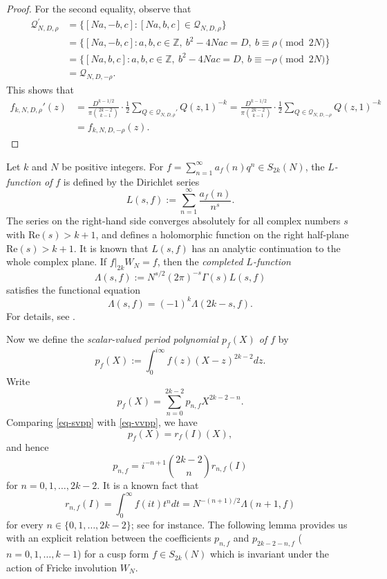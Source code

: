 \documentclass[12pt]{amsart}
\numberwithin{equation}{section}
\theoremstyle{definition}
\begin{document}
\begin{proof}
    For the second equality, observe that
    \begin{align*}
        \mathcal{Q}_{N,D,\rho}^{'}&=\{[Na,-b,c]:[Na,b,c]\in\mathcal{Q}_{N,D,\rho}\}\\
        &=\{[Na,-b,c]:a,b,c\in\mathbb{Z},~b^{2}-4Nac=D,~b\equiv\rho\pmod{2N}\}\\
        &=\{[Na,b,c]:a,b,c\in\mathbb{Z},~b^{2}-4Nac=D,~b\equiv-\rho\pmod{2N}\}\\
        &=\mathcal{Q}_{N,D,-\rho}.
    \end{align*}
    This shows that
    \begin{align*}
        f_{k,N,D,\rho}'(z)&=\frac{D^{k-1/2}}{\pi\binom{2k-2}{k-1}}\cdot\frac{1}{2}\sum_{Q\in\mathcal{Q}_{N,D,\rho}'}Q(z,1)^{-k}=\frac{D^{k-1/2}}{\pi\binom{2k-2}{k-1}}\cdot\frac{1}{2}\sum_{Q\in\mathcal{Q}_{N,D,-\rho}}Q(z,1)^{-k}\\
        &=f_{k,N,D,-\rho}(z).
    \end{align*}
\end{proof}

Let $k$ and $N$ be positive integers. For $f=\sum_{n=1}^{\infty}a_{f}(n)q^{n}\in S_{2k}(N)$, the \textit{$L$-function of} $f$ is defined by the Dirichlet series
$$L(s,f):=\sum_{n=1}^{\infty}\frac{a_{f}(n)}{n^{s}}.$$
The series on the right-hand side converges absolutely for all complex numbers $s$ with $\mathrm{Re}(s)>k+1$, and defines a holomorphic function on the right half-plane $\mathrm{Re}(s)>k+1$. It is known that $L(s,f)$ has an analytic continuation to the whole complex plane. If $f|_{2k}W_{N}=f$, then the \textit{completed $L$-function}
$$\Lambda(s,f):=N^{s/2}(2\pi)^{-s}\Gamma(s)L(s,f)$$
satisfies the functional equation
\begin{equation}\label{eq-functionaleq}
    \Lambda(s,f)=(-1)^{k}\Lambda(2k-s,f).
\end{equation}
For details, see \cite[pp. 270--271]{K92}.

Now we define the \textit{scalar-valued period polynomial $p_{f}(X)$ of $f$} by
\begin{equation}\label{eq-svpp}
    p_{f}(X):=\int_{0}^{i\infty}f(z)(X-z)^{2k-2}dz.
\end{equation}
Write
$$p_{f}(X)=\sum_{n=0}^{2k-2}p_{n,f}X^{2k-2-n}.$$
Comparing \eqref{eq-svpp} with \eqref{eq-vvpp}, we have
$$p_{f}(X)=r_{f}(I)(X),$$
and hence
$$p_{n,f}=i^{-n+1}\binom{2k-2}{n}r_{n,f}(I)$$
for $n=0,1,\ldots,2k-2$. It is a known fact that
\begin{equation}\label{eq-periodlval}
    r_{n,f}(I)=\int_{0}^{\infty}f(it)t^{n}dt=N^{-(n+1)/2}\Lambda(n+1,f)
\end{equation}
for every $n\in\{0,1,\ldots,2k-2\}$; see \cite[p. 268]{K92} for instance. The following lemma provides us with an explicit relation between the coefficients $p_{n,f}$ and $p_{2k-2-n,f}$ ($n=0,1,\ldots,k-1$) for a cusp form $f\in S_{2k}(N)$ which is invariant under the action of Fricke involution $W_{N}$.
\end{document}
